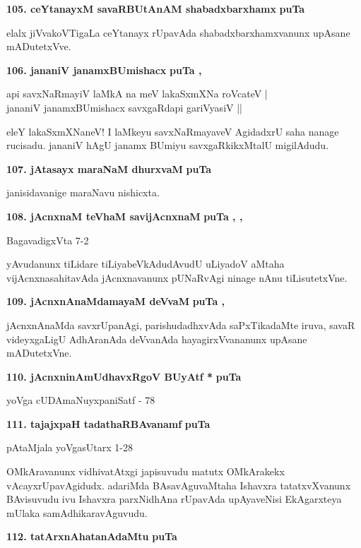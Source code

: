 \medskip
\noindent
\textbf{105. ceYtanayxM savaRBUtAnAM shabadxbarxhamx} \hfill{\bf puTa \pageref{203}}

\smallskip
elalx jiVvakoVTigaLa ceYtanayx rUpavAda shabadxbarxhamxvanunx upAsane mADutetxVve.

\medskip
\noindent
\textbf{106. jananiV janamxBUmishacx} \hfill{\bf puTa \pageref{101}, \pageref{103}}

\begin{shloka}
api savxNaRmayiV laMkA na meV lakaSxmXNa roVcateV |\\
jananiV janamxBUmishacx savxgaRdapi gariVyasiV ||
\end{shloka}

eleY lakaSxmXNaneV! I laMkeyu savxNaRmayaveV AgidadxrU saha nanage rucisadu. jananiV hAgU janamx BUmiyu savxgaRkikxMtalU migilAdudu.

\medskip
\noindent
\textbf{107. jAtasayx maraNaM dhurxvaM} \hfill{\bf puTa \pageref{122}}

\smallskip
janisidavanige maraNavu nishicxta.

\medskip
\noindent
\textbf{108. jAcnxnaM teVhaM savijAcnxnaM} \hfill{\bf puTa \pageref{page19b}, \pageref{72}, \pageref{102}}

\hfill{BagavadigxVta 7-2}

yAvudanunx tiLidare tiLiyabeVkAdudAvudU uLiyadoV aMtaha vijAcnxnasahitavAda jAcnxna\-vanunx pUNaRvAgi ninage nAnu tiLisutetxVne.

\medskip
\noindent
\textbf{109. jAcnxnAnaMdamayaM deVvaM} \hfill{\bf puTa \pageref{80c}, \pageref{102}}

\smallskip
jAcnxnAnaMda savxrUpanAgi, parishudadhxvAda saPxTikadaMte iruva, savaR videyxgaLigU AdhAranAda deVva\-nAda hayagirxVvananunx upAsane mADutetxVne.

\medskip
\noindent
\textbf{110. jAcnxninAmUdhavxRgoV BUyAtf *} \hfill{\bf puTa \pageref{133}}

\hfill{yoVga cUDAmaNuyxpaniSatf - 78}

\medskip
\noindent
\textbf{111. tajajxpaH tadathaRBAvanamf} \hfill{\bf puTa \pageref{147}}

\hfill{pAtaMjala yoVgasUtarx 1-28}

\smallskip
OMkAravanunx vidhivatAtxgi japisuvudu matutx OMkArakekx vAcayxrUpavAgidudx. adariMda BAsavAgu\-vaMtaha Ishavxra tatatxvXvanunx BAvisuvudu ivu Ishavxra parxNidhAna rUpavAda upAyaveNisi EkAgarxteya mUlaka samAdhikaravAguvudu.

\medskip
\noindent
\textbf{112. tatArxnAhatanAdaMtu} \hfill{\bf puTa \pageref{151}}

